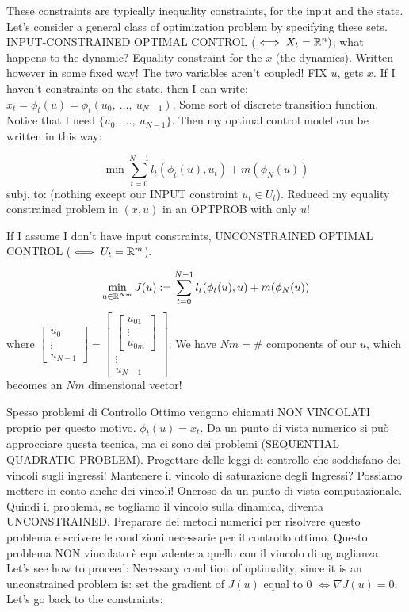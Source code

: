 These constraints are typically inequality constraints, for the input and the state. Let's consider a general class of optimization problem by specifying these sets. INPUT-CONSTRAINED OPTIMAL CONTROL ($\iff X_t=\mathbb{R}^n)$; what happens to the dynamic? Equality constraint for the $x$ (the \underline{dynamics}). Written however in some fixed way! The two variables aren't coupled! FIX $u$, gets $x$. If I haven't constraints on the state, then I can write: $x_t=\phi_t(u) = \phi_t(u_0,\ \dots,\ u_{N-1})$. Some sort of discrete transition function. Notice that I need $\{u_0,\ \dots,\ u_{N-1}\}$. Then my optimal control model can be written in this way:

\[
	\min{\sum_{t=0}^{N-1}{l_t(\phi_t(u),u_t)} + m(\phi_N(u))}
\]
subj. to: (nothing except our INPUT constraint $u_t\in U_t$). Reduced my equality constrained problem in $(x,u)$ in an OPTPROB with only $u$!

If I assume I don't have input constraints, UNCONSTRAINED OPTIMAL CONTROL ($\iff U_t=\mathbb{R}^m$).

\[
	\min_{u\in\mathbb{R}^{Nm}}{J(u) := \sum_{t=0}^{N-1}{l_t(\phi_t(u),u)} + m(\phi_N(u))}
\]
where $\begin{bmatrix}u_0\\ \vdots\\u_{N-1}\end{bmatrix} = \begin{bmatrix}\begin{bmatrix}u_{01}\\ \vdots\\u_{0m}\end{bmatrix}\\ \vdots\\u_{N-1}\end{bmatrix}$. We have $Nm = \#$ components of our $u$, which becomes an $Nm$ dimensional vector!

Spesso problemi di Controllo Ottimo vengono chiamati NON VINCOLATI proprio per questo motivo. $\phi_t(u) = x_t$. Da un punto di vista numerico si può approcciare questa tecnica, ma ci sono dei problemi (\underline{SEQUENTIAL QUADRATIC PROBLEM}). Progettare delle leggi di controllo che soddisfano dei vincoli sugli ingressi! Mantenere il vincolo di saturazione degli Ingressi? Possiamo mettere in conto anche dei vincoli! Oneroso da un punto di vista computazionale. Quindi il problema, se togliamo il vincolo sulla dinamica, diventa UNCONSTRAINED. Preparare dei metodi numerici per risolvere questo problema e scrivere le condizioni necessarie per il controllo ottimo. Questo problema NON vincolato è equivalente a quello con il vincolo di uguaglianza. Let's see how to proceed:
Necessary condition of optimality, since it is an unconstrained problem is: set the gradient of $J(u)$ equal to 0 $\iff \nabla{J(u)} = 0$. Let's go back to the constraints:

